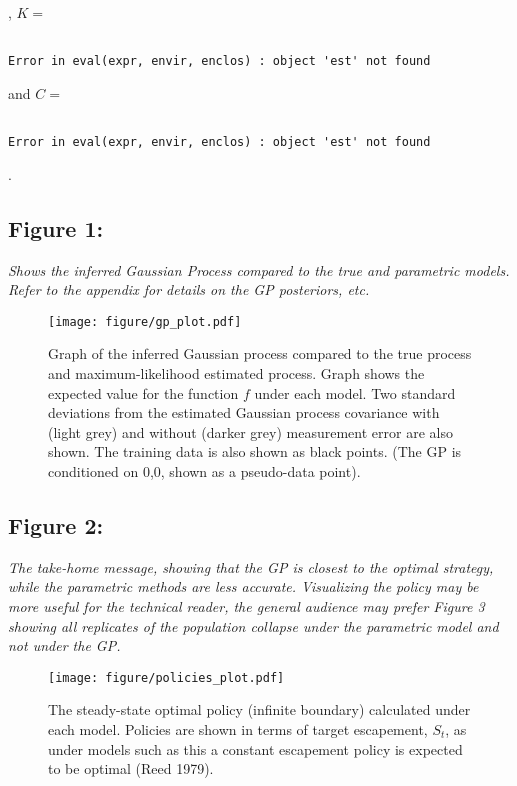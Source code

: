 \documentclass[author-year, review]{elsarticle} %
\begin{document}
, $K =$

\begin{verbatim}

Error in eval(expr, envir, enclos) : object 'est' not found
\end{verbatim}

and $C =$

\begin{verbatim}

Error in eval(expr, envir, enclos) : object 'est' not found
\end{verbatim}

.

\subsection{Figure 1:}

\emph{Shows the inferred Gaussian Process compared to the true and
parametric models. Refer to the appendix for details on the GP
posteriors, etc.}

\begin{figure}[htbp]
\centering
\texttt{[image: figure/gp\_plot.pdf]}
\caption{Graph of the inferred Gaussian process compared to the true
process and maximum-likelihood estimated process. Graph shows the
expected value for the function $f$ under each model. Two standard
deviations from the estimated Gaussian process covariance with (light
grey) and without (darker grey) measurement error are also shown. The
training data is also shown as black points. (The GP is conditioned on
0,0, shown as a pseudo-data point).}
\end{figure}

\subsection{Figure 2:}

\emph{The take-home message, showing that the GP is closest to the
optimal strategy, while the parametric methods are less accurate.
Visualizing the policy may be more useful for the technical reader, the
general audience may prefer Figure 3 showing all replicates of the
population collapse under the parametric model and not under the GP.}

\begin{figure}[htbp]
\centering
\texttt{[image: figure/policies\_plot.pdf]}
\caption{The steady-state optimal policy (infinite boundary) calculated
under each model. Policies are shown in terms of target escapement,
$S_t$, as under models such as this a constant escapement policy is
expected to be optimal (Reed 1979).}
\end{figure}
\end{document}
